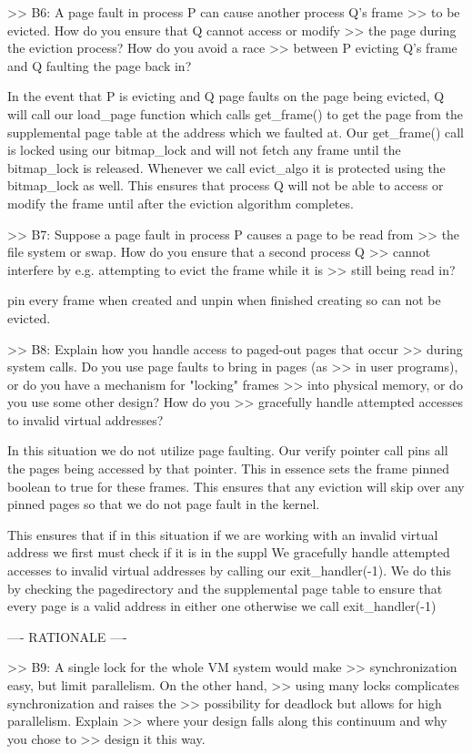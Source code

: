 >> B6: A page fault in process P can cause another process Q's frame
>> to be evicted.  How do you ensure that Q cannot access or modify
>> the page during the eviction process?  How do you avoid a race
>> between P evicting Q's frame and Q faulting the page back in?

In the event that P is evicting and Q page faults on the page being evicted,
Q will call our load_page function which calls get_frame() to get the page
from the supplemental page table at the address which we faulted at. 
Our get_frame() call is locked using our bitmap_lock and will not fetch 
any frame until the bitmap_lock is released. Whenever we call evict_algo 
it is protected using the bitmap_lock as well. This ensures that process 
Q will not be able to access or modify the frame until after the eviction 
algorithm completes. 

>> B7: Suppose a page fault in process P causes a page to be read from
>> the file system or swap.  How do you ensure that a second process Q
>> cannot interfere by e.g. attempting to evict the frame while it is
>> still being read in?

pin every frame when created and unpin when finished creating so can not be
evicted. 

>> B8: Explain how you handle access to paged-out pages that occur
>> during system calls.  Do you use page faults to bring in pages (as
>> in user programs), or do you have a mechanism for "locking" frames
>> into physical memory, or do you use some other design?  How do you
>> gracefully handle attempted accesses to invalid virtual addresses?

In this situation we do not utilize page faulting. Our verify pointer call
pins all the pages being accessed by that pointer. This in essence sets the
frame pinned boolean to true for these frames. This ensures that any eviction
will skip over any pinned pages so that we do not page fault in the kernel.

This ensures that if in this situation if we are working with an invalid
virtual address we first must check if it is in the suppl
We gracefully handle attempted accesses to invalid virtual addresses by
calling our exit_handler(-1). We do this by checking the pagedirectory
and the supplemental page table to ensure that every page is a valid
address in either one otherwise we call exit_handler(-1)


---- RATIONALE ----

>> B9: A single lock for the whole VM system would make
>> synchronization easy, but limit parallelism.  On the other hand,
>> using many locks complicates synchronization and raises the
>> possibility for deadlock but allows for high parallelism.  Explain
>> where your design falls along this continuum and why you chose to
>> design it this way.


